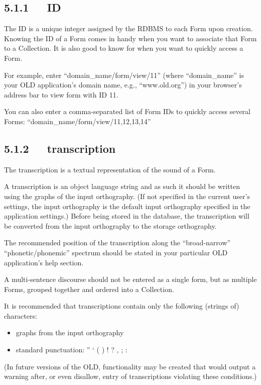 \documentclass[letterpaper,10pt,english]{sphinxmanual}
\begin{document}
\subsection{5.1.1   ID}
\label{documentation:id}
The ID is a unique integer assigned by the RDBMS to each Form upon creation.
Knowing the ID of a Form comes in handy when you want to associate that Form to
a Collection.  It is also good to know for when you want to quickly access a
Form.

For example, enter ``domain\_name/form/view/11'' (where
``domain\_name'' is your OLD application's domain name, e.g., ``www.old.org'') in
your browser's address bar to view form with ID 11.

You can also enter a comma-separated list of Form IDs to quickly access several
Forms: ``domain\_name/form/view/11,12,13,14''


\subsection{5.1.2   transcription}
\label{documentation:transcription}
The transcription is a textual representation of the sound of a Form.

A transcription is an object language string and as such it should be written
using the graphs of the input orthography.  (If not specified in the current
user's settings, the input orthography is the default input orthography
specified in the application settings.)  Before being stored in the database,
the transcription will be converted from the input orthography to the
storage orthography.

The recommended position of the transcription along the ``broad-narrow''
``phonetic/phonemic'' spectrum should be stated in your particular OLD
application's help section.

A multi-sentence discourse should not be entered as a single form, but as
multiple Forms, grouped together and ordered into a Collection.

It is recommended that transcriptions contain only the following (strings of)
characters:
\begin{itemize}
\item {} 
graphs from the input orthography

\item {} 
standard punctuation: '' ` ( ) ! ? , ; :

\end{itemize}

(In future versions of the OLD, functionality may be created that
would output a warning after, or even disallow, entry of transcriptions
violating these conditions.)
\end{document}
